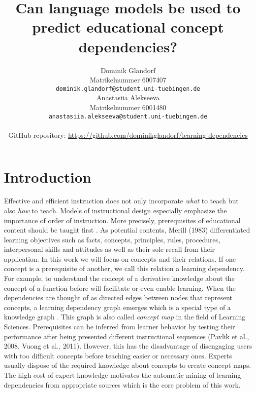 \documentclass{article}
\title{Can language models be used to predict educational concept dependencies?}
\author{%
  Dominik Glandorf\\
  Matrikelnummer 6007407\\
  \texttt{dominik.glandorf@student.uni-tuebingen.de} \\
  \And
  Anastasiia Alekseeva\\
  Matrikelnummer 6001480\\
  \texttt{anastasiia.alekseeva@student.uni-tuebingen.de} \\
  \\
  GitHub repository: \url{https://github.com/dominikglandorf/learning-dependencies}
}
\begin{document}
\vspace*{-5mm}
\maketitle
\vspace*{-5mm}

\begin{abstract}





\end{abstract}

\section{Introduction}
Effective and efficient instruction does not only incorporate \textit{what} to teach but also \textit{how} to teach. Models of instructional design especially emphasize the importance of order of instruction. More precisely, prerequisites of educational content should be taught first \citep{morrison2019designing}.
As potential contents, Merill (1983) differentiated learning objectives such as facts, concepts, principles, rules, procedures, interpersonal skills and attitudes as well as their sole recall from their application. In this work we will focus on concepts and their relations. 
If one concept is a prerequisite of another, we call this relation a learning dependency. For example, to understand the concept of a derivative knowledge about the concept of a function before will facilitate or even enable learning. When the dependencies are thought of as directed edges between nodes that represent concepts, a learning dependency graph emerges which is a special type of a knowledge graph \citep{wang2016using}. This graph is also called \textit{concept map} in the field of Learning Sciences.
Prerequisites can be inferred from learner behavior by testing their performance after being presented different instructional sequences (Pavlik et al., 2008, Vuong et al., 2011). However, this has the disadvantage of disengaging users with too difficult concepts before teaching easier or necessary ones. Experts usually dispose of the required knowledge about concepts to create concept maps. The high cost of expert knowledge motivates the automatic mining of learning dependencies from appropriate sources which is the core problem of this work.
\end{document}
